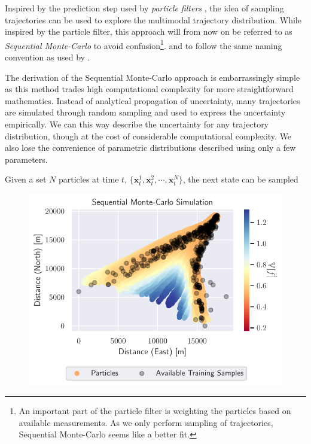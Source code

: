 Inspired by the prediction step used by \textit{particle filters} \cite{sensorfusjon}, the idea of sampling trajectories can be used to explore the multimodal trajectory distribution. While inspired by the particle filter, this approach will from now on be referred to as \textit{Sequential Monte-Carlo} to avoid confusion\footnote{An important part of the particle filter is weighting the particles based on available measurements. As we only perform sampling of trajectories, Sequential Monte-Carlo seems like a better fit.}. and to follow the same naming convention as used by \cite{pedestrian}.

The derivation of the Sequential Monte-Carlo approach is embarrassingly simple as this method trades high computational complexity for more straightforward mathematics. Instead of analytical propagation of uncertainty, many trajectories are simulated through random sampling and used to express the uncertainty empirically. We can this way describe the uncertainty for any trajectory distribution, though at the cost of considerable computational complexity. We also lose the convenience of parametric distributions described using only a few parameters.

Given a set $N$ particles at time $t$, $\{\boldsymbol{x}^1_t, \boldsymbol{x}^2_t, \cdots, \boldsymbol{x}^N_t\}$, the next state can be sampled

\begin{figure}[h]
    \centering
    \includegraphics[width=\textwidth]{figures/dyngp/gp_particle.pdf}
    \caption{}
    \label{fig:gp_particle}
\end{figure}

